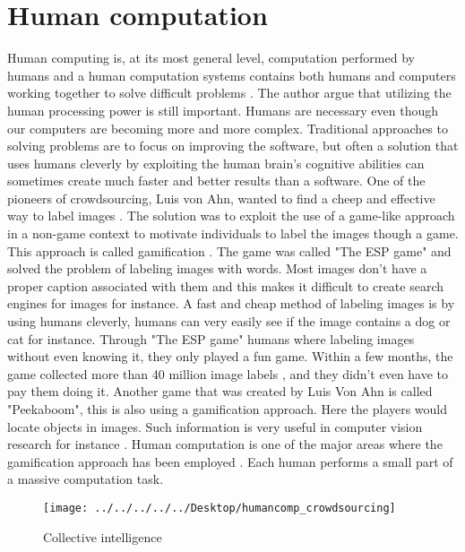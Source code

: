  
\section{Human computation}\label{sec:humancomputation}
Human computing is, at its most general level, computation performed by humans and a human computation systems contains both humans and computers working together to solve difficult problems \citep{Schulze2012}. The author argue that utilizing the human processing power is still important. Humans are necessary even though our computers are becoming more and more complex. Traditional approaches to solving problems are to focus on improving the software, but often a solution that uses humans cleverly by exploiting the human brain's cognitive abilities can sometimes create much faster and better results than a software. One of the pioneers of crowdsourcing, Luis von Ahn, wanted to find a cheep and effective way to label images \citep{VonAhn2008}. The solution was to exploit the use of a game-like approach in a non-game context to motivate individuals to label the images though a game. This approach is called gamification \citep{Huotari2017}. The game was called "The ESP game" and solved the problem of labeling images with words. Most images don't have a proper caption associated with them and this makes it difficult to create search engines for images for instance. A fast and cheap method of labeling images is by using humans cleverly, humans can very easily see if the image contains a dog or cat for instance. Through "The ESP game" humans where labeling images without even knowing it, they only played a fun game. Within a few months, the game collected more than 40 million image labels \citep{VonAhn2008}, and they didn't even have to pay them doing it. Another game that was created by Luis Von Ahn is called "Peekaboom", this is also using a gamification approach. Here the players would locate objects in images. Such information is very useful in computer vision research for instance \citep{VonAhn2008}. Human computation is one of the major areas where the gamification approach has been employed \citep{Morschheuser2016}. Each human performs a small part of a massive computation task.  

\begin{figure}[H]
	\centering
	\texttt{[image: ../../../../../Desktop/humancomp\_crowdsourcing]}
	\caption{Collective intelligence \citep{Quinn2011}}
	\label{fig:humancompcrowdsourcing}
\end{figure}

